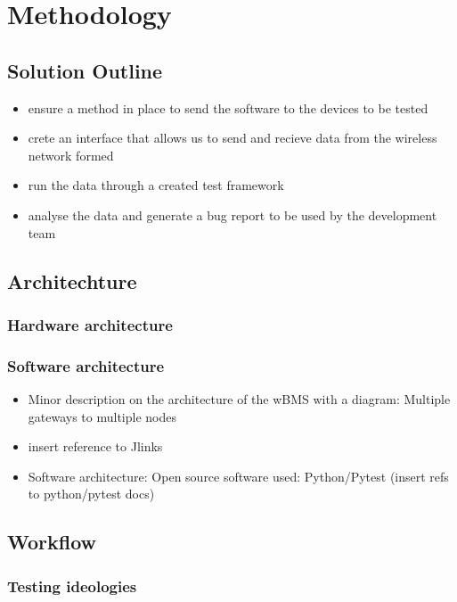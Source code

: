 \chapter{Methodology} %

\label{ch:meth}


\section{Solution Outline}
\begin{itemize}
    \item ensure a method in place to send the software to the devices to be tested
    \item crete an interface that allows us to send and recieve data from the wireless network formed
    \item run the data through a created test framework
    \item analyse the data and generate a bug report to be used by the development team
\end{itemize}

\section{Architechture}
\subsection{Hardware architecture}
\subsection{Software architecture}
\begin{itemize}
    \item Minor description on the architecture of the wBMS with a diagram: Multiple gateways to multiple nodes
    \item insert reference to Jlinks
    \item Software architecture: Open source software used: Python/Pytest (insert refs to python/pytest docs)
\end{itemize}

\section{Workflow}
\subsection{Testing ideologies}
